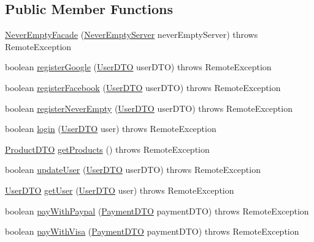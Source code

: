 \subsection*{Public Member Functions}
\begin{DoxyCompactItemize}
\item 
\mbox{\hyperlink{class_s_p_q_1_1remote_1_1_never_empty_facade_afc6e9b52fbed599fb3f152533d2bedea}{Never\+Empty\+Facade}} (\mbox{\hyperlink{class_s_p_q_1_1_never_empty_server}{Never\+Empty\+Server}} never\+Empty\+Server)  throws Remote\+Exception 
\item 
boolean \mbox{\hyperlink{class_s_p_q_1_1remote_1_1_never_empty_facade_aaa8d4a6148957029af068d00da24890b}{register\+Google}} (\mbox{\hyperlink{class_s_p_q_1_1dto_1_1_user_d_t_o}{User\+D\+TO}} user\+D\+TO)  throws Remote\+Exception 
\item 
boolean \mbox{\hyperlink{class_s_p_q_1_1remote_1_1_never_empty_facade_aa9845001ecd5228135d64415a4c12b20}{register\+Facebook}} (\mbox{\hyperlink{class_s_p_q_1_1dto_1_1_user_d_t_o}{User\+D\+TO}} user\+D\+TO)  throws Remote\+Exception 
\item 
boolean \mbox{\hyperlink{class_s_p_q_1_1remote_1_1_never_empty_facade_a52a0feff1dfb3347e55e46c3ac48fafc}{register\+Never\+Empty}} (\mbox{\hyperlink{class_s_p_q_1_1dto_1_1_user_d_t_o}{User\+D\+TO}} user\+D\+TO)  throws Remote\+Exception 
\item 
boolean \mbox{\hyperlink{class_s_p_q_1_1remote_1_1_never_empty_facade_a3fdd96efa1256ea520a497b8a20578e8}{login}} (\mbox{\hyperlink{class_s_p_q_1_1dto_1_1_user_d_t_o}{User\+D\+TO}} user)  throws Remote\+Exception 
\item 
\mbox{\hyperlink{class_s_p_q_1_1dto_1_1_product_d_t_o}{Product\+D\+TO}} \mbox{\hyperlink{class_s_p_q_1_1remote_1_1_never_empty_facade_a4c8bdeeb3d2c3eb2c28aec1043e9274f}{get\+Products}} ()  throws Remote\+Exception 
\item 
boolean \mbox{\hyperlink{class_s_p_q_1_1remote_1_1_never_empty_facade_a55ad685d3c176424a7f5f18e5ebe043b}{update\+User}} (\mbox{\hyperlink{class_s_p_q_1_1dto_1_1_user_d_t_o}{User\+D\+TO}} user\+D\+TO)  throws Remote\+Exception 
\item 
\mbox{\hyperlink{class_s_p_q_1_1dto_1_1_user_d_t_o}{User\+D\+TO}} \mbox{\hyperlink{class_s_p_q_1_1remote_1_1_never_empty_facade_a32679a25e12c8a33e84087de357cd616}{get\+User}} (\mbox{\hyperlink{class_s_p_q_1_1dto_1_1_user_d_t_o}{User\+D\+TO}} user)  throws Remote\+Exception 
\item 
boolean \mbox{\hyperlink{class_s_p_q_1_1remote_1_1_never_empty_facade_a9942c7930b5144f0677dc0fdcde25cc3}{pay\+With\+Paypal}} (\mbox{\hyperlink{class_s_p_q_1_1dto_1_1_payment_d_t_o}{Payment\+D\+TO}} payment\+D\+TO)  throws Remote\+Exception 
\item 
boolean \mbox{\hyperlink{class_s_p_q_1_1remote_1_1_never_empty_facade_a0ff9201cf33cb76c43dd85c892af93ba}{pay\+With\+Visa}} (\mbox{\hyperlink{class_s_p_q_1_1dto_1_1_payment_d_t_o}{Payment\+D\+TO}} payment\+D\+TO)  throws Remote\+Exception 
\end{DoxyCompactItemize}



